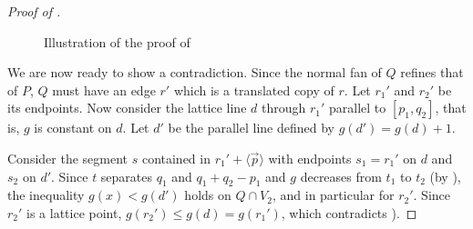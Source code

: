 \documentclass{amsart}
\theoremstyle{plain}
\theoremstyle{definition}
\renewcommand{\vec}[1]{\overrightarrow#1}
\newcommand{\vecline}[1]{\langle \vec #1 \rangle}
\begin{document}
\begin{proof}[Proof of ]
\begin{figure}[htb]
\scalebox{.75}{}
\caption{Illustration of the proof of }
\label{fig:claim4}
\end{figure}


We are now ready to show a contradiction. Since the normal fan of $Q$ refines that of $P$, $Q$ must have an edge $r'$ which is a translated copy of $r$. Let $r_1'$ and $r_2'$ be its endpoints. Now consider the lattice line $d$ through $r_1'$ parallel to  $[p_1, q_2]$, that is, $g$ is constant on $d$. Let $d'$ be the parallel line defined by $g(d')=g(d)+1$. 


Consider the segment $s$ contained in $r_1' + \vecline p$ with endpoints $s_1=r_1'$ on $d$ and $s_2$ on $d'$.  
Since $t$ separates $q_1$ and $q_1+q_2-p_1$ and $g$ decreases from $t_1$ to $t_2$ (by ), the inequality $g(x)< g(d')$ holds on $Q\cap V_2$,
and in particular for $r_2'$. Since $r_2'$ is a lattice point, $g(r_2')\leq g(d)= g(r_1')$, which contradicts ).
\end{proof}
\end{document}
